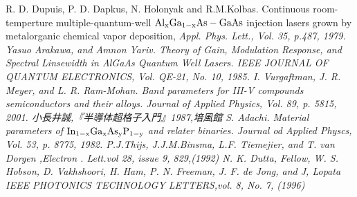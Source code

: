 \begin{thebibliography}{99}
 R. D. Dupuis, P. D. Dapkus, N. Holonyak and R.M.Kolbas. Continuous room-temperture multiple-quantum-well $\rm{Al_{x}Ga_{1-x}As-GaAs}$ injection lasers grown by metalorganic chemical vapor deposition, \sl  Appl. Phys. Lett.\rm , Vol. 35, p.487, 1979.
 Yasuo Arakawa, and Amnon Yariv. Theory of Gain, Modulation Response, and Spectral Linsewidth in AlGaAs Quantum Well Lasers. \sl IEEE JOURNAL OF QUANTUM ELECTRONICS\rm , Vol. QE-21, No. 10, 1985.
 I. Vurgaftman, J. R. Meyer, and L. R. Ram-Mohan. Band parameters for III-V compounds semiconductors and their alloys. \sl Journal of Applied Physics\rm , Vol. 89, p. 5815, 2001.
小長井誠,『半導体超格子入門』1987,培風館
 S. Adachi. Material parameters of $\rm{In_{1-x}Ga_{x}As_{y}P_{1-y}}$ and relater binaries. \sl Journal od Applied Physcs\rm , Vol. 53, p. 8775, 1982.
 P.J.Thijs, J.J.M.Binsma, L.F. Tiemejier, and T. van Dorgen ,\sl Electron . Lett.\rm vol 28, issue 9, 829,(1992)
N. K. Dutta, Fellow, W. S. Hobson, D. Vakhshoori, H. Ham, P. N. Freeman, J. F. de Jong, and J, Lopata \sl IEEE PHOTONICS TECHNOLOGY LETTERS\rm ,vol. 8, No. 7, (1996)











\end{thebibliography}
